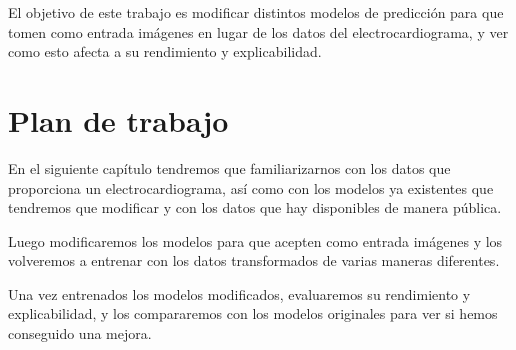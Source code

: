 El objetivo de este trabajo es modificar distintos modelos de predicción para que tomen como entrada imágenes en lugar de los datos del electrocardiograma, y ver como esto afecta a su rendimiento y explicabilidad.

\section{Plan de trabajo}
En el siguiente capítulo tendremos que familiarizarnos con los datos que proporciona un electrocardiograma, así como con los modelos ya existentes que tendremos que modificar y con los datos que hay disponibles de manera pública.

Luego modificaremos los modelos para que acepten como entrada imágenes y los volveremos a entrenar con los datos transformados de varias maneras diferentes.

Una vez entrenados los modelos modificados, evaluaremos su rendimiento y explicabilidad, y los compararemos con los modelos originales para ver si hemos conseguido una mejora.
